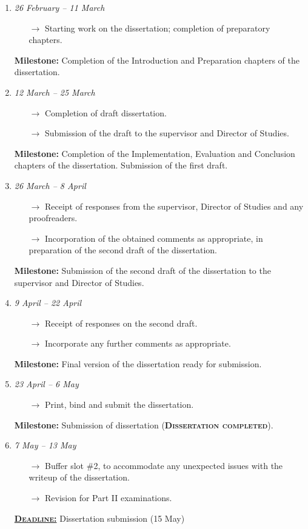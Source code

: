 \begin{enumerate}[label=\bf Slot \arabic*:]
    \item \emph{26 February -- 11 March}
        \begin{itemize}
            \item[$\rightarrow$] Starting work on the dissertation; completion of preparatory chapters.
        \end{itemize}
        \textbf{Milestone:} Completion of the Introduction and Preparation chapters of the dissertation.
    \item \emph{12 March -- 25 March}
        \begin{itemize}
            \item[$\rightarrow$] Completion of draft dissertation.
            \item[$\rightarrow$] Submission of the draft to the supervisor and Director of Studies.
        \end{itemize}
        \textbf{Milestone:} Completion of the Implementation, Evaluation and Conclusion chapters of the dissertation. Submission of the first draft.
        \item \emph{26 March -- 8 April}
        \begin{itemize}
            \item[$\rightarrow$] Receipt of responses from the supervisor, Director of Studies and any proofreaders.
            \item[$\rightarrow$] Incorporation of the obtained comments as appropriate, in preparation of the second draft of the dissertation.
        \end{itemize}
        \textbf{Milestone:} Submission of the second draft of the dissertation to the supervisor and Director of Studies.
    \item \emph{9 April -- 22 April}
        \begin{itemize}
            \item[$\rightarrow$] Receipt of responses on the second draft.
            \item[$\rightarrow$] Incorporate any further comments as appropriate.
        \end{itemize}
        \textbf{Milestone:} Final version of the dissertation ready for submission.
    \item \emph{23 April -- 6 May}
        \begin{itemize}
            \item[$\rightarrow$] Print, bind and submit the dissertation.
        \end{itemize}
        \textbf{Milestone:} Submission of dissertation (\textbf{\textsc{Dissertation completed}}).
    \item \emph{7 May -- 13 May}
        \begin{itemize}
            \item[$\rightarrow$] Buffer slot \#2, to accommodate any unexpected issues with the writeup of the dissertation.
            \item[$\rightarrow$] Revision for Part II examinations.
        \end{itemize}
        \underline{\textbf{\textsc{Deadline:}}} Dissertation submission (15 May)
\end{enumerate}
